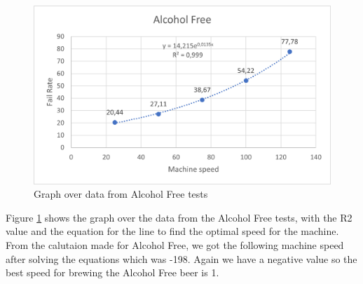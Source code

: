 \begin{center}
    \centering
    \begin{figure}[H]
        \includegraphics[width=1\textwidth]{img/AlcoholFree_graph.png}
        \caption{Graph over data from Alcohol Free tests}
        \label{fig:AlcoholFree_graph}
    \end{figure}
\end{center}

Figure \ref{fig:AlcoholFree_graph} shows the graph over the data from the Alcohol Free tests, with the R2 value and the equation for the line to find the optimal speed for the machine. \newline
From the calutaion made for Alcohol Free, we got the following machine speed after solving the equations which was -198. Again we have a negative value so the best speed for brewing the Alcohol Free beer is 1. \newline